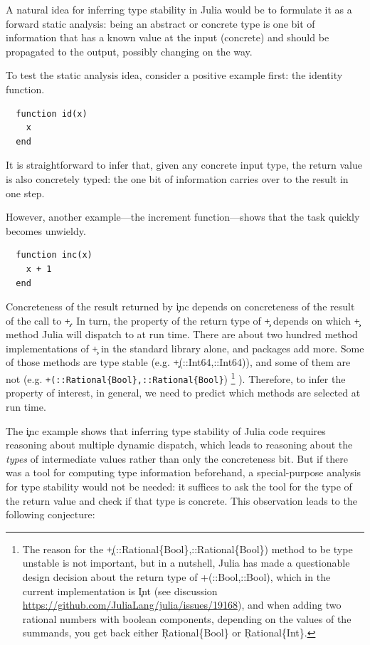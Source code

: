 A natural idea for inferring type stability in Julia would be to formulate it as
a forward static analysis: being an abstract or concrete type is one bit of
information that has a known value at the input (concrete) and should be
propagated to the output, possibly changing on the way.

To test the static analysis idea, consider a positive example first: the
identity function.
\begin{lstlisting}
  function id(x)
    x
  end
\end{lstlisting}
%
It is straightforward to infer that, given any concrete input type, the return
value is also concretely typed: the one bit of information carries over to the
result in one step.

However, another example---the increment function---shows that the task quickly 
becomes unwieldy.
%
\begin{lstlisting}
  function inc(x)
    x + 1
  end
\end{lstlisting}
%
Concreteness of the result returned by \c{inc} depends on concreteness of
the result of the call to \c{+}. In turn, the property of the return type of
\c{+} depends on which \c{+} method Julia will dispatch to at run time.
There are about two hundred method implementations of \c{+} in the standard
library alone, and packages add more. Some of those methods are type stable
(e.g. \c{+(::Int64,::Int64)}), and some of them are not (e.g.
\lstinline|+(::Rational{Bool},::Rational{Bool}|)
\footnote{%
  The reason for the
  \c{+(::Rational\{Bool\},::Rational\{Bool\})} method to be type
  unstable is not important, but in a nutshell, Julia has made a questionable
  design decision about the return type of \c{{+}(::Bool,::Bool)}, which in the
  current implementation is \c{Int}
  (see discussion \url{https://github.com/JuliaLang/julia/issues/19168}),
  and when adding two rational numbers with boolean components, depending on the
  values of the summands, you get back either \c{Rational\{Bool\}} or
  \c{Rational\{Int\}}.}
).
Therefore,
to infer the property of interest, in general,
we need to predict which methods are selected at run time.

The \c{inc} example shows that inferring type stability of Julia code
requires
reasoning about %
multiple dynamic dispatch, which leads
to reasoning about the \emph{types} of intermediate values rather than only
the concreteness bit. But if there was a tool for computing type information
beforehand, a special-purpose analysis for type stability would not be needed: 
it suffices to ask the tool for the type of the return value and
check if that type is concrete. 
This observation leads to the following conjecture:

